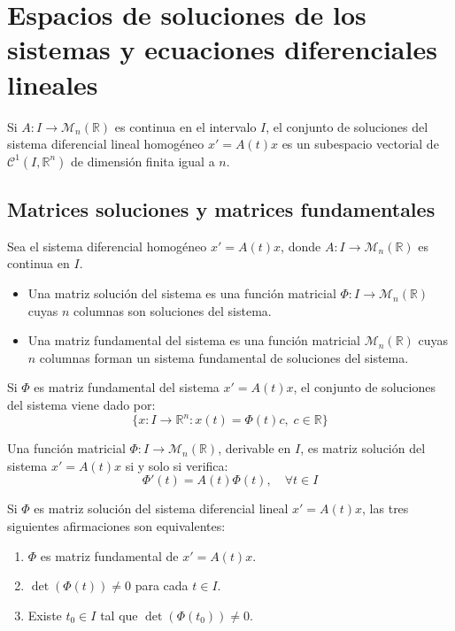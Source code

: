 \chapter{Espacios de soluciones de los sistemas y ecuaciones diferenciales lineales}
\begin{theorem}
    Si $A: I \to \mathcal{M}_n(\mathbb{R})$ es continua en el intervalo $I$, el conjunto de soluciones del sistema diferencial lineal homogéneo $x' = A(t)x$ es un subespacio vectorial de $\mathcal{C}^1(I, \mathbb{R}^n)$ de dimensión finita igual a $n$.
\end{theorem}

\section{Matrices soluciones y matrices fundamentales}
\begin{definition}
    Sea el sistema diferencial homogéneo $x' = A(t)x$, donde $A: I \to \mathcal{M}_n(\mathbb{R})$ es continua en $I$.
    \begin{itemize}
        \item Una matriz solución del sistema es una función matricial $\Phi: I \to \mathcal{M}_n(\mathbb{R})$ cuyas $n$ columnas son soluciones del sistema.
        \item Una matriz fundamental del sistema es una función matricial $\mathcal{M}_n(\mathbb{R})$ cuyas $n$ columnas forman un sistema fundamental de soluciones del sistema.
    \end{itemize}

    Si $\Phi$ es matriz fundamental del sistema $x' = A(t)x$, el conjunto de soluciones del sistema viene dado por:
    $$\{x: I \to \mathbb{R}^n: x(t) = \Phi(t)c, \; c \in \mathbb{R}\}$$
\end{definition}

\begin{theorem}
    Una función matricial $\Phi: I \to \mathcal{M}_n(\mathbb{R})$, derivable en $I$, es matriz solución del sistema $x' = A(t)x$ si y solo si verifica:
    $$\Phi'(t) = A(t)\Phi(t), \quad \forall t \in I$$
\end{theorem}

\begin{theorem}
    Si $\Phi$ es matriz solución del sistema diferencial lineal $x' = A(t)x$, las tres siguientes afirmaciones son equivalentes:
    \begin{enumerate}
        \item $\Phi$ es matriz fundamental de $x' = A(t)x$.
        \item $\det(\Phi(t)) \neq 0$ para cada $t \in I$.
        \item Existe $t_0 \in I$ tal que $\det(\Phi(t_0)) \neq 0$.
    \end{enumerate}
\end{theorem}

